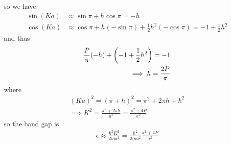 \documentclass[../main.tex]{subfiles}
\begin{document}
so we have
\begin{align*}
    \sin(Ka) &\approx \sin \pi + h \cos{\pi} = -h \\
    \cos(Ka) &\approx \cos \pi + h (-\sin \pi) + \frac{1}{2} h^2 (-\cos \pi) = -1 + \frac{1}{2} h^2
\end{align*}
and thus
\begin{align*}
    \frac{P}{\pi} (-h) + \qt(-1 + \frac{1}{2} h^2) = -1 \\
    \implies h = \frac{2P}{\pi}
\end{align*}
where 
\begin{align*}
    (Ka)^2 = (\pi + h)^2 = \pi^2 + 2\pi h + h^2 \\
    \implies K^2 = \frac{\pi^2 + 2\pi h}{a^2} = \frac{\pi^2 + 4P}{a^2}
\end{align*}
so the band gap is 
\begin{align*}
    \epsilon \approx \frac{\hbar^2 K^2}{2ma^2}
    = \frac{\hbar^2}{2ma^2} \frac{\pi^2 + 4P}{a^2} 
\end{align*}
\end{document}
